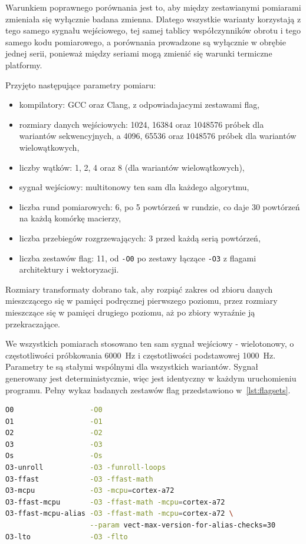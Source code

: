 Warunkiem poprawnego porównania jest to, aby między zestawianymi pomiarami
zmieniała się wyłącznie badana zmienna. Dlatego wszystkie warianty korzystają
z tego samego sygnału wejściowego, tej samej tablicy współczynników obrotu
i tego samego kodu pomiarowego, a porównania prowadzone są wyłącznie w obrębie
jednej serii, ponieważ między seriami mogą zmienić się warunki termiczne
platformy.

Przyjęto następujące parametry pomiaru:

\begin{itemize}
    \item kompilatory: GCC oraz Clang, z odpowiadajacymi zestawami flag,
    \item rozmiary danych wejściowych: 1024, 16384 oraz 1048576 próbek dla wariantów
      sekwencyjnych, a 4096, 65536 oraz 1048576 próbek dla wariantów
      wielowątkowych,
    \item liczby wątków: 1, 2, 4 oraz 8 (dla wariantów wielowątkowych),
    \item sygnał wejściowy: multitonowy ten sam dla każdego algorytmu,
    \item liczba rund pomiarowych: 6, po 5 powtórzeń w rundzie, co daje
          30 powtórzeń na każdą komórkę macierzy,
    \item liczba przebiegów rozgrzewających: 3 przed każdą serią powtórzeń,
    \item liczba zestawów flag: 11, od \texttt{-O0} po zestawy łączące
          \texttt{-O3} z flagami architektury i wektoryzacji.
\end{itemize}

Rozmiary transformaty dobrano tak, aby rozpiąć zakres od zbioru danych
mieszczącego się w pamięci podręcznej pierwszego poziomu, przez rozmiary
mieszczące się w pamięci drugiego poziomu, aż po zbiory wyraźnie ją
przekraczające.

We wszystkich pomiarach stosowano ten sam sygnał wejściowy - wielotonowy,
o częstotliwości próbkowania 6000~Hz i częstotliwości podstawowej 1000~Hz.
Parametry te są stałymi wspólnymi dla wszystkich wariantów.
Sygnał generowany jest deterministycznie, więc jest identyczny w każdym uruchomieniu programu.
Pełny wykaz badanych zestawów flag przedstawiono w~\cref{lst:flagsets}.

\begin{lstlisting}[language=bash,caption={Zestawy flag kompilacji badane w~pracy},label=lst:flagsets]
O0                  -O0
O1                  -O1
O2                  -O2
O3                  -O3
Os                  -Os
O3-unroll           -O3 -funroll-loops
O3-ffast            -O3 -ffast-math
O3-mcpu             -O3 -mcpu=cortex-a72
O3-ffast-mcpu       -O3 -ffast-math -mcpu=cortex-a72
O3-ffast-mcpu-alias -O3 -ffast-math -mcpu=cortex-a72 \
                    --param vect-max-version-for-alias-checks=30
O3-lto              -O3 -flto
\end{lstlisting}

